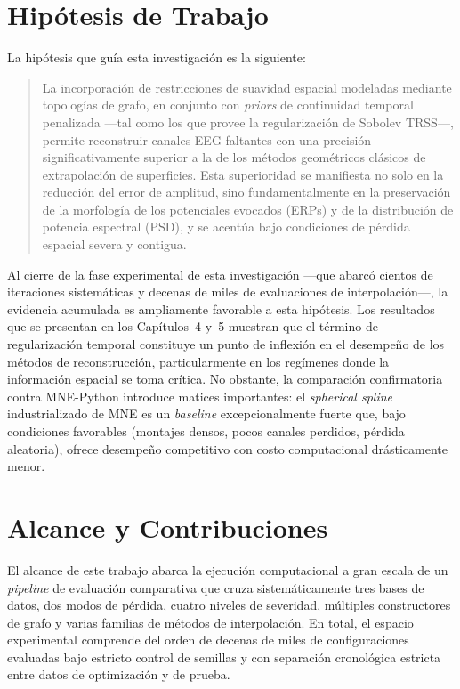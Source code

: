 \section{Hipótesis de Trabajo}

La hipótesis que guía esta investigación es la siguiente:

\begin{quote}
La incorporación de restricciones de suavidad espacial modeladas mediante topologías de grafo, en conjunto con \textit{priors} de continuidad temporal penalizada —tal como los que provee la regularización de Sobolev TRSS—, permite reconstruir canales EEG faltantes con una precisión significativamente superior a la de los métodos geométricos clásicos de extrapolación de superficies. Esta superioridad se manifiesta no solo en la reducción del error de amplitud, sino fundamentalmente en la preservación de la morfología de los potenciales evocados (ERPs) y de la distribución de potencia espectral (PSD), y se acentúa bajo condiciones de pérdida espacial severa y contigua.
\end{quote}

Al cierre de la fase experimental de esta investigación —que abarcó cientos de iteraciones sistemáticas y decenas de miles de evaluaciones de interpolación—, la evidencia acumulada es ampliamente favorable a esta hipótesis. Los resultados que se presentan en los Capítulos~4 y~5 muestran que el término de regularización temporal constituye un punto de inflexión en el desempeño de los métodos de reconstrucción, particularmente en los regímenes donde la información espacial se toma crítica. No obstante, la comparación confirmatoria contra MNE-Python introduce matices importantes: el \textit{spherical spline} industrializado de MNE es un \textit{baseline} excepcionalmente fuerte que, bajo condiciones favorables (montajes densos, pocos canales perdidos, pérdida aleatoria), ofrece desempeño competitivo con costo computacional drásticamente menor.

\section{Alcance y Contribuciones}

El alcance de este trabajo abarca la ejecución computacional a gran escala de un \textit{pipeline} de evaluación comparativa que cruza sistemáticamente tres bases de datos, dos modos de pérdida, cuatro niveles de severidad, múltiples constructores de grafo y varias familias de métodos de interpolación. En total, el espacio experimental comprende del orden de decenas de miles de configuraciones evaluadas bajo estricto control de semillas y con separación cronológica estricta entre datos de optimización y de prueba.

